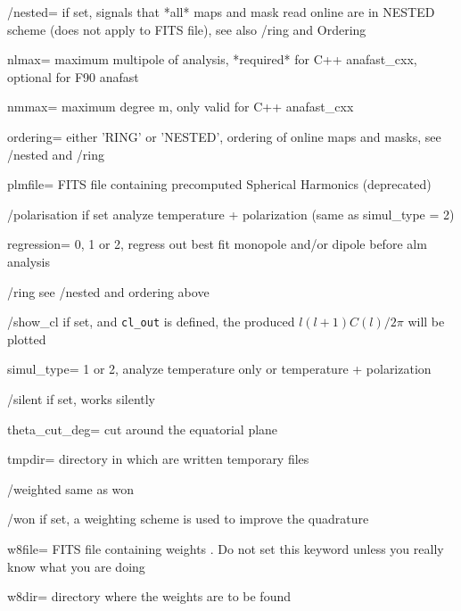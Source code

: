 \begin{keywords}
\begin{kwlist}{}
\item[/nested=] if set, signals that *all* maps and mask read online are in
   NESTED scheme (does not apply to FITS file), see also /ring and Ordering

\item[nlmax=]   maximum multipole of analysis, *required* for C++ anafast\_cxx,
      optional for F90 anafast

\item[nmmax=]   maximum degree m, only valid for C++ anafast\_cxx 

\item[ordering=] either 'RING' or 'NESTED', ordering of online maps and masks,
 see /nested and /ring

\item[plmfile=] FITS file containing precomputed Spherical Harmonics (deprecated) 

\item[/polarisation] if set analyze temperature + polarization (same as simul\_type = 2)

\item[regression=] 0, 1 or 2, regress out best fit monopole and/or dipole before
    alm analysis

\item[/ring] see /nested and ordering above

\item[/show\_cl] if set, and {\tt cl\_out} is defined, the produced $l (l+1) C(l)/2\pi$ will
be plotted

\item[simul\_type=] 1 or 2, analyze temperature only or temperature + polarization

\item[/silent]    if set, works silently

\item[theta\_cut\_deg=] cut around the equatorial plane 

\item[tmpdir=]      directory in which are written temporary files 

\item[/weighted]     same as won

\item[/won]     if set, a weighting scheme is used to improve the quadrature

\item[w8file=]    FITS file containing weights 
     .
   Do not set this keyword unless you really know what you are doing

\item[w8dir=]     directory where the weights are to be found 

  \end{kwlist}
\end{keywords}  

